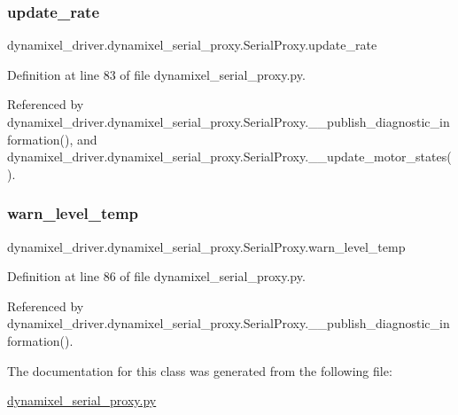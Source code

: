 \subsubsection{\texorpdfstring{update\+\_\+rate}{update\_rate}}
{\footnotesize\ttfamily dynamixel\+\_\+driver.\+dynamixel\+\_\+serial\+\_\+proxy.\+Serial\+Proxy.\+update\+\_\+rate}



Definition at line 83 of file dynamixel\+\_\+serial\+\_\+proxy.\+py.



Referenced by dynamixel\+\_\+driver.\+dynamixel\+\_\+serial\+\_\+proxy.\+Serial\+Proxy.\+\_\+\+\_\+publish\+\_\+diagnostic\+\_\+information(), and dynamixel\+\_\+driver.\+dynamixel\+\_\+serial\+\_\+proxy.\+Serial\+Proxy.\+\_\+\+\_\+update\+\_\+motor\+\_\+states().

\mbox{\label{classdynamixel__driver_1_1dynamixel__serial__proxy_1_1_serial_proxy_a1bd026c25af7682998bdfcf957c7dd2d}} 
\subsubsection{\texorpdfstring{warn\+\_\+level\+\_\+temp}{warn\_level\_temp}}
{\footnotesize\ttfamily dynamixel\+\_\+driver.\+dynamixel\+\_\+serial\+\_\+proxy.\+Serial\+Proxy.\+warn\+\_\+level\+\_\+temp}



Definition at line 86 of file dynamixel\+\_\+serial\+\_\+proxy.\+py.



Referenced by dynamixel\+\_\+driver.\+dynamixel\+\_\+serial\+\_\+proxy.\+Serial\+Proxy.\+\_\+\+\_\+publish\+\_\+diagnostic\+\_\+information().



The documentation for this class was generated from the following file\+:\begin{DoxyCompactItemize}
\item 
\hyperlink{dynamixel__serial__proxy_8py}{dynamixel\+\_\+serial\+\_\+proxy.\+py}\end{DoxyCompactItemize}
